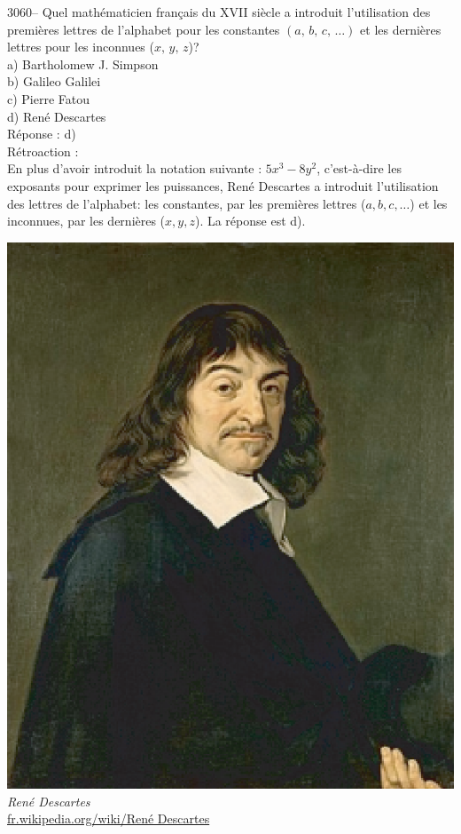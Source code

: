 \documentclass[letterpaper, 12pt]{article}
\begin{document}
3060-- Quel math\'ematicien fran\c cais du {\scriptsize XVII\ieme{}} si\`ecle a introduit l'utilisation des premi\`eres lettres de l'alphabet pour les constantes $(a,\,b,\,c,\,\dots)$ et les derni\`eres lettres pour les inconnues ($x,\,y,\,z$)?\\

a) Bartholomew J. Simpson\\
b) Galileo Galilei\\
c) Pierre Fatou\\
d) Ren\'e Descartes\\

R\'eponse : d)\\

R\'etroaction :\\
En plus d'avoir introduit la notation suivante : $5x^{3} - 8y^{2}$, c'est-\`a-dire les exposants pour exprimer les puissances, Ren\'e Descartes a introduit l'utilisation des lettres de l'alphabet: les constantes, par les premi\`eres lettres ($a, b, c, \dots$) et les inconnues, par les derni\`eres ($x, y, z$). La r\'eponse est d).\\
\begin{center}
\includegraphics[scale=0.4]{Descartes.eps}\\
\emph{{\small Ren\'e Descartes}}\\
\href{http://fr.wikipedia.org/wiki/Ren\%C3\%A9 Descartes}{fr.wikipedia.org/wiki/Ren\'e Descartes}\\[5mm]
\end{center}
\end{document}
